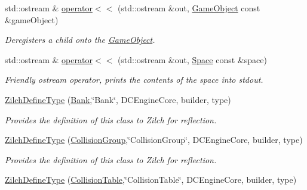 \begin{DoxyCompactItemize}
\item 
std\-::ostream \& \hyperlink{namespaceDCEngine_ad50079f85b713abb3cf4b0d0fb3cfc6a}{operator$<$$<$} (std\-::ostream \&out, \hyperlink{classDCEngine_1_1GameObject}{Game\-Object} const \&game\-Object)
\begin{DoxyCompactList}\small\item\em Deregisters a child onto the \hyperlink{classDCEngine_1_1GameObject}{Game\-Object}. \end{DoxyCompactList}\item 
std\-::ostream \& \hyperlink{namespaceDCEngine_acf2dcaa0c82450236c61561c7576a080}{operator$<$$<$} (std\-::ostream \&out, \hyperlink{classDCEngine_1_1Space}{Space} const \&space)
\begin{DoxyCompactList}\small\item\em Friendly ostream operator, prints the contents of the space into stdout. \end{DoxyCompactList}\item 
\hypertarget{namespaceDCEngine_a095e8e7f63e882170d6f9e957aa8e182}{\hyperlink{namespaceDCEngine_a095e8e7f63e882170d6f9e957aa8e182}{Zilch\-Define\-Type} (\hyperlink{classDCEngine_1_1Bank}{Bank},\char`\"{}Bank\char`\"{}, D\-C\-Engine\-Core, builder, type)}\label{namespaceDCEngine_a095e8e7f63e882170d6f9e957aa8e182}

\begin{DoxyCompactList}\small\item\em Provides the definition of this class to Zilch for reflection. \end{DoxyCompactList}\item 
\hypertarget{namespaceDCEngine_a50393c490ef1601aa23e2cc191186bbc}{\hyperlink{namespaceDCEngine_a50393c490ef1601aa23e2cc191186bbc}{Zilch\-Define\-Type} (\hyperlink{classDCEngine_1_1CollisionGroup}{Collision\-Group},\char`\"{}Collision\-Group\char`\"{}, D\-C\-Engine\-Core, builder, type)}\label{namespaceDCEngine_a50393c490ef1601aa23e2cc191186bbc}

\begin{DoxyCompactList}\small\item\em Provides the definition of this class to Zilch for reflection. \end{DoxyCompactList}\item 
\hypertarget{namespaceDCEngine_a00e724cf4070a0c771cf5eae4a9a7ee6}{\hyperlink{namespaceDCEngine_a00e724cf4070a0c771cf5eae4a9a7ee6}{Zilch\-Define\-Type} (\hyperlink{classDCEngine_1_1CollisionTable}{Collision\-Table},\char`\"{}Collision\-Table\char`\"{}, D\-C\-Engine\-Core, builder, type)}\label{namespaceDCEngine_a00e724cf4070a0c771cf5eae4a9a7ee6}


\end{DoxyCompactItemize}
